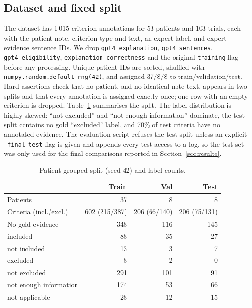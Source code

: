 \documentclass[conference]{IEEEtran}
\begin{document}
\subsection{Dataset and fixed split}
The dataset has 1\,015 criterion annotations for 53 patients and 103 trials, each with the patient note, criterion type and text, an expert label, and expert evidence sentence IDs. We drop \texttt{gpt4\_explanation}, \texttt{gpt4\_sentences}, \texttt{gpt4\_eligibility}, \texttt{explanation\_correctness} and the original \texttt{training} flag before any processing. Unique patient IDs are sorted, shuffled with \texttt{numpy.random.default\_rng(42)}, and assigned 37/8/8 to train/validation/test. Hard assertions check that no patient, and no identical note text, appears in two splits and that every annotation is assigned exactly once; one row with an empty criterion is dropped. Table~\ref{tab:split} summarises the split. The label distribution is highly skewed: ``not excluded'' and ``not enough information'' dominate, the test split contains no gold ``excluded'' label, and 70\% of test criteria have no annotated evidence. The evaluation script refuses the test split unless an explicit \texttt{--final-test} flag is given and appends every test access to a log, so the test set was only used for the final comparisons reported in Section~\ref{sec:results}.

\begin{table}[t]
\centering
\caption{Patient-grouped split (seed 42) and label counts.}
\label{tab:split}
\footnotesize
\setlength{\tabcolsep}{3.5pt}
\begin{tabular}{lrrr}
\toprule
 & Train & Val & Test \\
\midrule
Patients & 37 & 8 & 8 \\
Criteria (incl./excl.) & 602 (215/387) & 206 (66/140) & 206 (75/131) \\
No gold evidence & 348 & 116 & 145 \\
\midrule
included & 88 & 35 & 27 \\
not included & 13 & 3 & 7 \\
excluded & 8 & 2 & 0 \\
not excluded & 291 & 101 & 91 \\
not enough information & 174 & 53 & 66 \\
not applicable & 28 & 12 & 15 \\
\bottomrule
\end{tabular}
\end{table}
\end{document}
